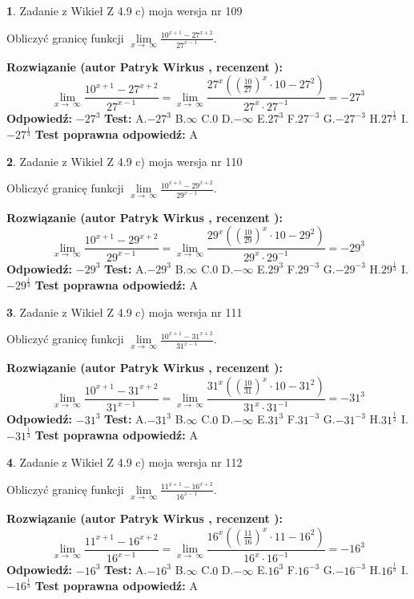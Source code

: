 \documentclass[12pt, a4paper]{article}
\theoremstyle{definition} %
\newtheorem{zad}{}
\newcommand{\zadStart}[1]{\begin{zad}#1\newline}
\newcommand{\zadStop}{\end{zad}}
\newcommand{\rozwStart}[2]{\noindent \textbf{Rozwiązanie (autor #1 , recenzent #2): }\newline}
\newcommand{\rozwStop}{\newline}
\newcommand{\odpStart}{\noindent \textbf{Odpowiedź:}\newline}
\newcommand{\odpStop}{\newline}
\newcommand{\testStart}{\noindent \textbf{Test:}\newline}
\newcommand{\testStop}{\newline}
\newcommand{\kluczStart}{\noindent \textbf{Test poprawna odpowiedź:}\newline}
\newcommand{\kluczStop}{\newline}
\begin{document}
\zadStart{Zadanie z Wikieł Z 4.9 c) moja wersja nr 109}


Obliczyć granicę funkcji  $\lim\limits_{x\to\ \infty}\frac{10^{x+1}-27^{x+2}}{27^{x-1}}$.
\zadStop
\rozwStart{Patryk Wirkus}{}
$$\lim\limits_{x\to\ \infty}\frac{10^{x+1}-27^{x+2}}{27^{x-1}}=\lim\limits_{x\to\ \infty}\frac{27^{x}((\frac{10}{27})^{x}\cdot 10 -27^{2})}{27^{x}\cdot 27^{-1}} = -27^{3}$$
\rozwStop
\odpStart
$-27^{3}$
\odpStop
\testStart
A.$-27^{3}$ B.$\infty$ C.$0$ D.$-\infty$ E.$27^{3}$
F.$27^{-3}$ G.$-27^{-3}$
H.$27^{\frac{1}{3}}$
I.$-27^{\frac{1}{3}}$
\testStop
\kluczStart
A
\kluczStop



\zadStart{Zadanie z Wikieł Z 4.9 c) moja wersja nr 110}


Obliczyć granicę funkcji  $\lim\limits_{x\to\ \infty}\frac{10^{x+1}-29^{x+2}}{29^{x-1}}$.
\zadStop
\rozwStart{Patryk Wirkus}{}
$$\lim\limits_{x\to\ \infty}\frac{10^{x+1}-29^{x+2}}{29^{x-1}}=\lim\limits_{x\to\ \infty}\frac{29^{x}((\frac{10}{29})^{x}\cdot 10 -29^{2})}{29^{x}\cdot 29^{-1}} = -29^{3}$$
\rozwStop
\odpStart
$-29^{3}$
\odpStop
\testStart
A.$-29^{3}$ B.$\infty$ C.$0$ D.$-\infty$ E.$29^{3}$
F.$29^{-3}$ G.$-29^{-3}$
H.$29^{\frac{1}{3}}$
I.$-29^{\frac{1}{3}}$
\testStop
\kluczStart
A
\kluczStop



\zadStart{Zadanie z Wikieł Z 4.9 c) moja wersja nr 111}


Obliczyć granicę funkcji  $\lim\limits_{x\to\ \infty}\frac{10^{x+1}-31^{x+2}}{31^{x-1}}$.
\zadStop
\rozwStart{Patryk Wirkus}{}
$$\lim\limits_{x\to\ \infty}\frac{10^{x+1}-31^{x+2}}{31^{x-1}}=\lim\limits_{x\to\ \infty}\frac{31^{x}((\frac{10}{31})^{x}\cdot 10 -31^{2})}{31^{x}\cdot 31^{-1}} = -31^{3}$$
\rozwStop
\odpStart
$-31^{3}$
\odpStop
\testStart
A.$-31^{3}$ B.$\infty$ C.$0$ D.$-\infty$ E.$31^{3}$
F.$31^{-3}$ G.$-31^{-3}$
H.$31^{\frac{1}{3}}$
I.$-31^{\frac{1}{3}}$
\testStop
\kluczStart
A
\kluczStop



\zadStart{Zadanie z Wikieł Z 4.9 c) moja wersja nr 112}


Obliczyć granicę funkcji  $\lim\limits_{x\to\ \infty}\frac{11^{x+1}-16^{x+2}}{16^{x-1}}$.
\zadStop
\rozwStart{Patryk Wirkus}{}
$$\lim\limits_{x\to\ \infty}\frac{11^{x+1}-16^{x+2}}{16^{x-1}}=\lim\limits_{x\to\ \infty}\frac{16^{x}((\frac{11}{16})^{x}\cdot 11 -16^{2})}{16^{x}\cdot 16^{-1}} = -16^{3}$$
\rozwStop
\odpStart
$-16^{3}$
\odpStop
\testStart
A.$-16^{3}$ B.$\infty$ C.$0$ D.$-\infty$ E.$16^{3}$
F.$16^{-3}$ G.$-16^{-3}$
H.$16^{\frac{1}{3}}$
I.$-16^{\frac{1}{3}}$
\testStop
\kluczStart
A
\kluczStop
\end{document}
